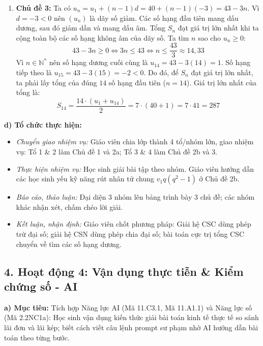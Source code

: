 \documentclass[12pt, a4paper]{article}
\begin{document}
\begin{enumerate}[leftmargin=0.6cm]
    \item \textbf{Chủ đề 3:}
    Ta có $u_n = u_1 + (n - 1)d = 40 + (n - 1)(-3) = 43 - 3n$.
    Vì $d = -3 < 0$ nên $(u_n)$ là dãy số giảm. Các số hạng đầu tiên mang dấu dương, sau đó giảm dần và mang dấu âm.
    Tổng $S_n$ đạt giá trị lớn nhất khi ta cộng toàn bộ các số hạng không âm của dãy số.
    Ta tìm $n$ sao cho $u_n \ge 0$:
    $$43 - 3n \ge 0 \iff 3n \le 43 \iff n \le \dfrac{43}{3} \approx 14{,}33$$
    Vì $n \in \mathbb{N}^*$ nên số hạng dương cuối cùng là $u_{14} = 43 - 3(14) = 1$. Số hạng tiếp theo là $u_{15} = 43 - 3(15) = -2 < 0$.
    Do đó, để $S_n$ đạt giá trị lớn nhất, ta phải lấy tổng của đúng $14$ số hạng đầu tiên ($n = 14$).
    Giá trị lớn nhất của tổng là:
    $$S_{14} = \dfrac{14 \cdot (u_1 + u_{14})}{2} = 7 \cdot (40 + 1) = 7 \cdot 41 = 287$$
\end{enumerate}

\noindent \textbf{d) Tổ chức thực hiện:}
\begin{itemize}[leftmargin=0.8cm]
    \item \textit{Chuyển giao nhiệm vụ:} Giáo viên chia lớp thành 4 tổ/nhóm lớn, giao nhiệm vụ: Tổ 1 \& 2 làm Chủ đề 1 và 2a; Tổ 3 \& 4 làm Chủ đề 2b và 3.
    \item \textit{Thực hiện nhiệm vụ:} Học sinh giải bài tập theo nhóm. Giáo viên hướng dẫn các học sinh yếu kỹ năng rút nhân tử chung $v_1 q(q^2 - 1)$ ở Chủ đề 2b.
    \item \textit{Báo cáo, thảo luận:} Đại diện 3 nhóm lên bảng trình bày 3 chủ đề; các nhóm khác nhận xét, chấm chéo lời giải.
    \item \textit{Kết luận, nhận định:} Giáo viên chốt phương pháp: Giải hệ CSC dùng phép trừ đại số; giải hệ CSN dùng phép chia đại số; bài toán cực trị tổng CSC chuyển về tìm các số hạng dương.
\end{itemize}

\subsection*{4. Hoạt động 4: Vận dụng thực tiễn \& Kiểm chứng số - AI}

\noindent \textbf{a) Mục tiêu:}
Tích hợp Năng lực AI (Mã 11.C3.1, Mã 11.A1.1) và Năng lực số (Mã 2.2NC1a): Học sinh vận dụng kiến thức giải bài toán kinh tế thực tế so sánh lãi đơn và lãi kép; biết cách viết câu lệnh prompt sư phạm nhờ AI hướng dẫn bài toán theo từng bước.
\end{document}
